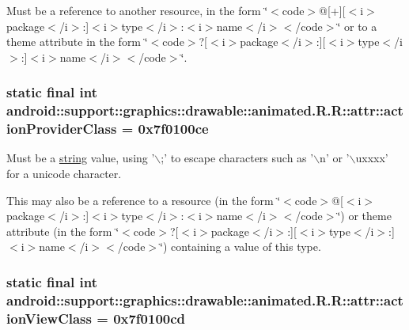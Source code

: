 Must be a reference to another resource, in the form \char`\"{}$<$code$>$@\mbox{[}+\mbox{]}\mbox{[}$<$i$>$package$<$/i$>$:\mbox{]}$<$i$>$type$<$/i$>$:$<$i$>$name$<$/i$>$$<$/code$>$\char`\"{} or to a theme attribute in the form \char`\"{}$<$code$>$?\mbox{[}$<$i$>$package$<$/i$>$:\mbox{]}\mbox{[}$<$i$>$type$<$/i$>$:\mbox{]}$<$i$>$name$<$/i$>$$<$/code$>$\char`\"{}. \hypertarget{classandroid_1_1support_1_1graphics_1_1drawable_1_1animated_1_1_r_1_1attr_9387bebf2bf59553a2dd6f14f0937932}{
\subsubsection[{actionProviderClass}]{\setlength{\rightskip}{0pt plus 5cm}static final int android::support::graphics::drawable::animated.R.R::attr::actionProviderClass = 0x7f0100ce}}
\label{classandroid_1_1support_1_1graphics_1_1drawable_1_1animated_1_1_r_1_1attr_9387bebf2bf59553a2dd6f14f0937932}


Must be a \hyperlink{classandroid_1_1support_1_1graphics_1_1drawable_1_1animated_1_1_r_1_1string}{string} value, using '$\backslash$;' to escape characters such as '$\backslash$n' or '$\backslash$uxxxx' for a unicode character. 

This may also be a reference to a resource (in the form \char`\"{}$<$code$>$@\mbox{[}$<$i$>$package$<$/i$>$:\mbox{]}$<$i$>$type$<$/i$>$:$<$i$>$name$<$/i$>$$<$/code$>$\char`\"{}) or theme attribute (in the form \char`\"{}$<$code$>$?\mbox{[}$<$i$>$package$<$/i$>$:\mbox{]}\mbox{[}$<$i$>$type$<$/i$>$:\mbox{]}$<$i$>$name$<$/i$>$$<$/code$>$\char`\"{}) containing a value of this type. \hypertarget{classandroid_1_1support_1_1graphics_1_1drawable_1_1animated_1_1_r_1_1attr_675e11392ee053057a936e93f3d33025}{
\subsubsection[{actionViewClass}]{\setlength{\rightskip}{0pt plus 5cm}static final int android::support::graphics::drawable::animated.R.R::attr::actionViewClass = 0x7f0100cd}}
\label{classandroid_1_1support_1_1graphics_1_1drawable_1_1animated_1_1_r_1_1attr_675e11392ee053057a936e93f3d33025}


